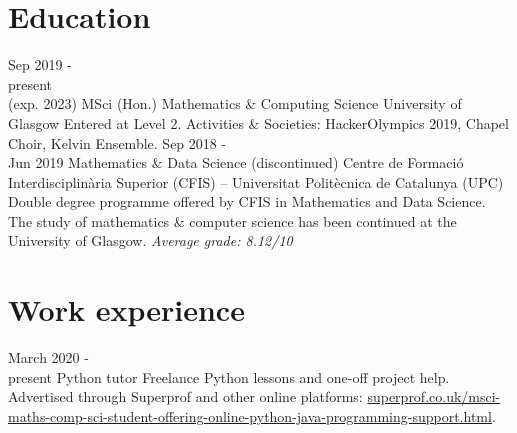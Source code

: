 \documentclass[]{resume}
\begin{document}
\makeprofile







\newcommand{\itemwidth}{10cm}
\newcommand{\chronowidth}{2.5cm}


\begin{adjustwidth}{10pt}{10pt}

\section*{Education}


\renewcommand{\twentylen}{\itemwidth}
\begin{twenty}[\chronowidth]
  \twentyitem
    {\noindent Sep 2019 - \\ present \\(exp. 2023)}
    {\large MSci (Hon.) Mathematics \& Computing Science}
    {{} \newline University of Glasgow}
    {Entered at Level 2. Activities \& Societies: HackerOlympics 2019, Chapel Choir, Kelvin Ensemble.}
  \twentyitem
    {Sep 2018 -  \\Jun 2019}
    {Mathematics \& Data Science (discontinued)}
    {Centre de Formació Interdisciplinària Superior (CFIS) – Universitat Politècnica de Catalunya (UPC)}
    {Double degree programme offered by CFIS in Mathematics and Data Science. The study of mathematics \& computer science has been continued at the University of Glasgow. \textit{Average grade: 8.12/10}}
\end{twenty}



\section*{Work experience}
\renewcommand{\twentylen}{\itemwidth}
\begin{twenty}[\chronowidth]
    \twentyitem
    {\noindent March 2020 - \\ present}
    {Python tutor}
    {Freelance}
    {Python lessons and one-off project help. Advertised through Superprof and other online platforms: \href{https://www.superprof.co.uk/msci-maths-comp-sci-student-offering-online-python-java-programming-support.html}{superprof.co.uk/msci-maths-comp-sci-student-offering-online-python-java-programming-support.html}.}
\end{twenty}



\end{adjustwidth}
\end{document}
